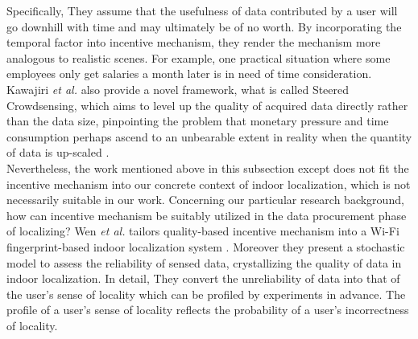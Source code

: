 \documentclass[10pt,conference,compsocconf,letterpaper]{IEEEtran}
\begin{document}
Specifically, They assume that the usefulness of data contributed by a user will go downhill with time and may ultimately be of no worth. By incorporating the temporal factor into incentive mechanism, they render the mechanism more analogous to realistic scenes. For example,
one practical situation where some employees only get salaries a month later is in need of time consideration.  %
Kawajiri \emph{et al.} also provide a novel framework, what is called Steered Crowdsensing, which aims to level up the quality of acquired data directly rather than the data size, pinpointing the problem that monetary pressure and time consumption perhaps ascend to an unbearable extent in reality when the quantity of data is up-scaled \cite{Kawajiri2014Steered}.\\ %
\indent Nevertheless, the work mentioned above in this subsection except \cite{Kawajiri2014Steered} does not fit the incentive mechanism into our concrete context of indoor localization, which is not necessarily suitable in our work. Concerning our particular research background, how can incentive mechanism be suitably utilized in the data procurement phase of localizing? Wen \emph{et al.} tailors quality-based incentive mechanism into a Wi-Fi fingerprint-based indoor localization system \cite{Wen2015Quality}. %
Moreover they present a stochastic model to assess the reliability of sensed data, crystallizing the quality of data in indoor localization. In detail, They convert the unreliability of data into that of the user's sense of locality which can be profiled by experiments in advance. The profile of a user's sense of locality reflects the probability of a user's incorrectness of locality.
\end{document}
